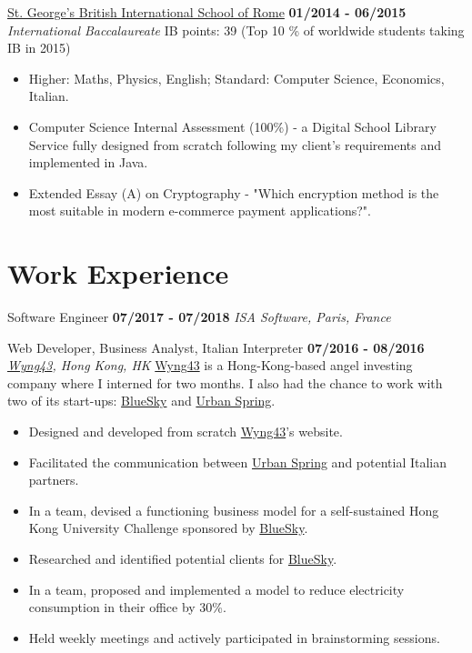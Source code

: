 \documentclass[]{friggeri-cv}
\begin{document}
\begin{entrylist}
\begin{itemize}
    \end{itemize}
  \entry
    {}
    {\href{http://www.stgeorge.school.it/}{St. George's British International School of Rome}}
    {\textbf{01/2014 - 06/2015}}
    {\emph{International Baccalaureate}}
    {IB points: 39  (Top 10 \% of worldwide students taking IB in 2015)}
    \begin{itemize}
        \item Higher: Maths, Physics, English; Standard: Computer Science, Economics, Italian.
        \item Computer Science Internal Assessment (100\%) - a Digital School Library Service fully designed from scratch following my client's requirements and implemented in Java.
        \item Extended Essay (A) on Cryptography - "Which encryption method is the most suitable in modern e-commerce payment applications?".
    \end{itemize}
\end{entrylist}

\section{\color{red}Work \color{gray} Experience}
\begin{entrylist}
  \entry
    {}
    {Software Engineer}
    {\textbf{07/2017 - 07/2018}}
    {\emph{ISA Software, Paris, France}}
    
\end{entrylist}
\begin{entrylist}
  \entry
    {}
    {Web Developer, Business Analyst, Italian Interpreter}
    {\textbf{07/2016 - 08/2016}}
    {\emph{\href{http://www.wyng43.com/}{Wyng43}, Hong Kong, HK}}
    {\href{http://www.wyng43.com/}{Wyng43} is a Hong-Kong-based angel investing company where I interned for two months. I also had the chance to work with two of its start-ups: \href{http://www.hibluesky.co/}{BlueSky} and \href{http://www.urbanspring.hk/}{Urban Spring}.}
    \begin{itemize}
        \item Designed and developed from scratch \href{http://www.wyng43.com/}{Wyng43}'s website.
        \item Facilitated the communication between \href{http://www.urbanspring.hk/}{Urban Spring} and potential Italian partners.
        \item In a team, devised a functioning business model for a self-sustained Hong Kong University Challenge sponsored by \href{http://www.hibluesky.co/}{BlueSky}.
        \item Researched and identified potential clients for \href{http://www.hibluesky.co/}{BlueSky}. 
        \item In a team, proposed and implemented a model to reduce electricity consumption in their office by 30\%.
        \item Held weekly meetings and actively participated in brainstorming sessions.
    \end{itemize}
\end{entrylist}
\clearpage
\newpage
\end{document}
